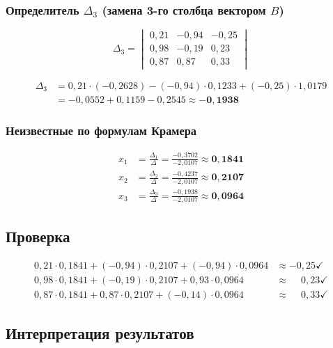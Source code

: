 \documentclass[a4paper,12pt]{article}
\begin{document}
\subsubsection{Определитель \texorpdfstring{$\Delta_3$}{Delta3} (замена 3-го столбца вектором \texorpdfstring{$B$}{B})}

\[
\Delta_3 =
\begin{vmatrix} 0{,}21 & -0{,}94 & -0{,}25 \\ 0{,}98 & -0{,}19 & 0{,}23 \\ 0{,}87 & 0{,}87 & 0{,}33 \end{vmatrix}
\]

\begin{align*}
\Delta_3 &= 0{,}21\cdot(-0{,}2628) - (-0{,}94)\cdot 0{,}1233 + (-0{,}25)\cdot 1{,}0179 \\
         &= -0{,}0552 + 0{,}1159 - 0{,}2545 \approx \mathbf{-0{,}1938}
\end{align*}

\subsubsection{Неизвестные по формулам Крамера}
\begin{align*}
x_1 &= \frac{\Delta_1}{\Delta} = \frac{-0{,}3702}{-2{,}0107} \approx \mathbf{0{,}1841} \\[0.2cm]
x_2 &= \frac{\Delta_2}{\Delta} = \frac{-0{,}4237}{-2{,}0107} \approx \mathbf{0{,}2107} \\[0.2cm]
x_3 &= \frac{\Delta_3}{\Delta} = \frac{-0{,}1938}{-2{,}0107} \approx \mathbf{0{,}0964}
\end{align*}

\subsection{Проверка}

\begin{align*}
0{,}21\cdot 0{,}1841 + (-0{,}94)\cdot 0{,}2107 + (-0{,}94)\cdot 0{,}0964 &\approx -0{,}25 \checkmark \\
0{,}98\cdot 0{,}1841 + (-0{,}19)\cdot 0{,}2107 + 0{,}93\cdot 0{,}0964    &\approx \phantom{-}0{,}23 \checkmark \\
0{,}87\cdot 0{,}1841 + 0{,}87\cdot 0{,}2107 + (-0{,}14)\cdot 0{,}0964    &\approx \phantom{-}0{,}33 \checkmark
\end{align*}

\subsection{Интерпретация результатов}
\end{document}
